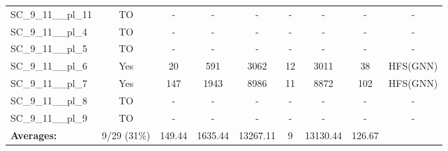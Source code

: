 \documentclass{article}
\begin{document}
\begin{tabular}{lcccccccc}
SC\_9\_11\_\_pl\_11 & TO & - & - & - & - & - & - & - \\
SC\_9\_11\_\_pl\_4 & TO & - & - & - & - & - & - & - \\
SC\_9\_11\_\_pl\_5 & TO & - & - & - & - & - & - & - \\
SC\_9\_11\_\_pl\_6 & Yes & 20 & 591 & 3062 & 12 & 3011 & 38 & HFS(GNN) \\
SC\_9\_11\_\_pl\_7 & Yes & 147 & 1943 & 8986 & 11 & 8872 & 102 & HFS(GNN) \\
SC\_9\_11\_\_pl\_8 & TO & - & - & - & - & - & - & - \\
SC\_9\_11\_\_pl\_9 & TO & - & - & - & - & - & - & - \\
\textbf{Averages:} & 9/29 (31\%) & 149.44 & 1635.44 & 13267.11 & 9 & 13130.44 & 126.67 & \\
\bottomrule
\end{tabular}
\\[0.7cm]
\end{document}
